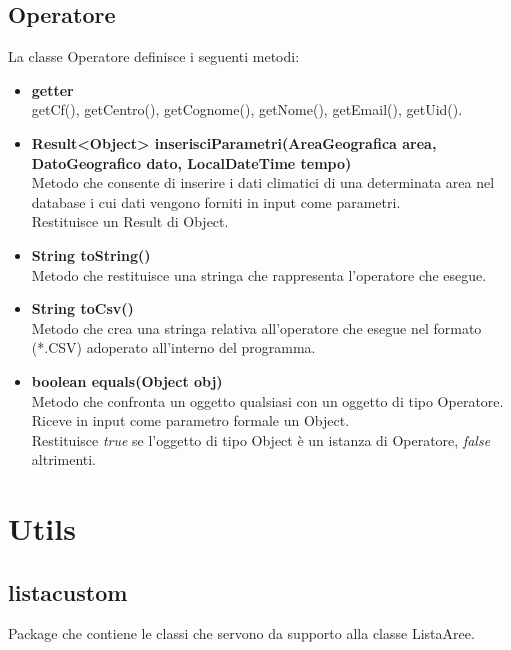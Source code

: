 \documentclass[a4paper, 12pt]{scrreprt}
\begin{document}
			\subsection{Operatore}
			La classe Operatore definisce i seguenti metodi:\\
			\begin{itemize}
				\item \textbf{getter}
				\\getCf(), getCentro(), getCognome(), getNome(), getEmail(), getUid().
				
				\item \textbf{Result<Object> inserisciParametri(AreaGeografica area, DatoGeografico dato, LocalDateTime tempo)}
				\\Metodo che consente di inserire i dati climatici di una determinata area nel database i cui dati vengono forniti in input come parametri.
				\\Restituisce un Result di Object.
				
				\item \textbf{String toString()}
				\\Metodo che restituisce una stringa che rappresenta l'operatore che esegue.
				
				\item \textbf{String toCsv()}
				\\Metodo che crea una stringa relativa all'operatore che esegue nel formato (*.CSV) adoperato all'interno del programma.
				
				\item \textbf{boolean equals(Object obj)}
				\\Metodo che confronta un oggetto qualsiasi con un oggetto di tipo Operatore.
				\\Riceve in input come parametro formale un Object.
				\\Restituisce \textit{true} se l'oggetto di tipo Object \`e un istanza di Operatore, \textit{false} altrimenti.
			\end{itemize}

		\section{Utils}
			\subsection{listacustom}
			Package che contiene le classi che servono da supporto alla classe ListaAree.
\end{document}
